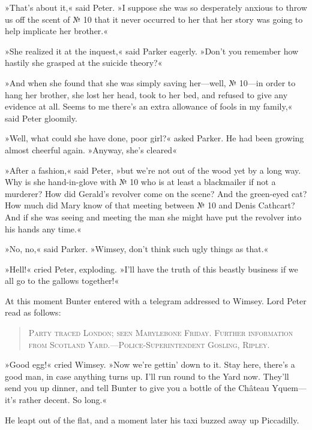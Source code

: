»That's about it,« said Peter. »I suppose she was so desperately anxious to throw us off the scent of № 10 that it never occurred to her that her story was going to help implicate her brother.«

»She realized it at the inquest,« said Parker eagerly. »Don't you remember how hastily she grasped at the suicide theory?«

»And when she found that she was simply saving her—well, № 10—in order to hang her brother, she lost her head, took to her bed, and refused to give any evidence at all. Seems to me there's an extra allowance of fools in my family,« said Peter gloomily.

»Well, what could she have done, poor girl?« asked Parker. He had been growing almost cheerful again. »Anyway, she's cleared\longdash«

»After a fashion,« said Peter, »but we're not out of the wood yet by a long way. Why is she hand-in-glove with № 10 who is at least a blackmailer if not a murderer? How did Gerald's revolver come on the scene? And the green-eyed cat? How much did Mary know of that meeting between № 10 and Denis Cathcart? And if she was seeing and meeting the man she might have put the revolver into his hands any time.«

»No, no,« said Parker. »Wimsey, don't think such ugly things as that.«

»Hell!« cried Peter, exploding. »I'll have the truth of this beastly business if we all go to the gallows together!«

At this moment Bunter entered with a telegram addressed to Wimsey. Lord Peter read as follows:

\begin{quote}

\textsc{Party traced London; seen Marylebone Friday. Further information from Scotland Yard.—Police-Superintendent Gosling, Ripley.}

\end{quote}

»Good egg!« cried Wimsey. »Now we're gettin' down to it. Stay here, there's a good man, in case anything turns up. I'll run round to the Yard now. They'll send you up dinner, and tell Bunter to give you a bottle of the Château Yquem—it's rather decent. So long.«

He leapt out of the flat, and a moment later his taxi buzzed away up Piccadilly.
